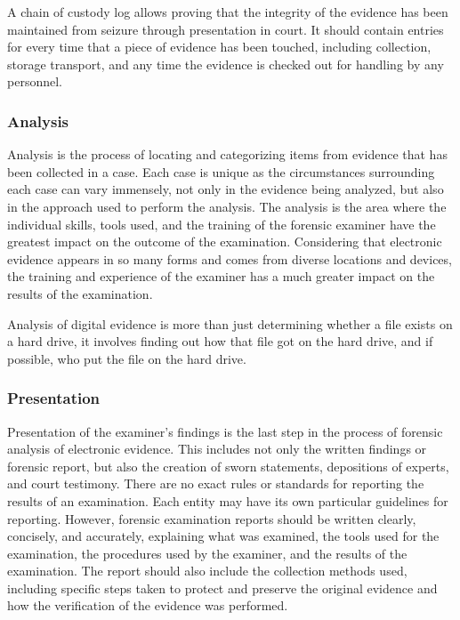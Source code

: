 A chain of custody log allows proving that the integrity of the evidence has been maintained from seizure
through presentation in court. It should contain entries for every time that a piece of evidence
has been touched, including collection, storage transport, and any time the evidence is checked out for
handling by any personnel.

\subsubsection*{Analysis}

Analysis is the process of locating and categorizing items from evidence
that has been collected in a case. Each case is unique as the
circumstances surrounding each case can vary immensely, not only in the evidence being analyzed, but also in the
approach used to perform the analysis. The analysis is the area where
the individual skills, tools used, and the training of the forensic examiner have
the greatest impact on the outcome of the examination. Considering that electronic evidence
appears in so many forms and comes from diverse locations and devices,
the training and experience of the examiner has a much greater impact
on the results of the examination.

Analysis of digital evidence is more than just determining whether a file exists on a hard drive, it involves finding out how
that file got on the hard drive, and if possible, who put the file on the hard drive.

\subsubsection*{Presentation}

Presentation of the examiner's findings is the last step in the process of forensic
analysis of electronic evidence. This includes not only the written findings or forensic
report, but also the creation of sworn statements, depositions of experts, and court testimony.
There are no exact rules or standards for reporting the results of an
examination. Each entity may have its own particular guidelines
for reporting. However, forensic examination reports should be written clearly, concisely,
and accurately, explaining what was examined, the tools used for the examination,
the procedures used by the examiner, and the results of the examination.
The report should also include the collection methods used, including specific steps
taken to protect and preserve the original evidence and how the verification of the
evidence was performed.

